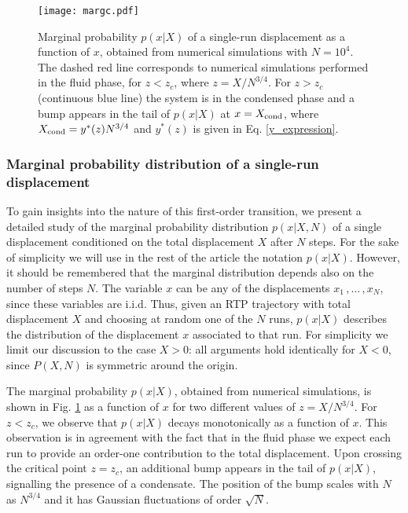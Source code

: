 \documentclass[aps,pre,twocolumn,superscriptaddress,showpacs]{revtex4-1}
\begin{document}
\begin{figure}
\texttt{[image: margc.pdf]}
\caption{Marginal probability $p(x|X)$ of a single-run displacement as a function of $x$, obtained from numerical simulations with $N=10^4$. The dashed red line corresponds to numerical simulations performed in the fluid phase, for $z<z_c$, where $z=X/N^{3/4}$. For $z>z_c$ (continuous blue line) the system is in the condensed phase and a bump appears in the tail of $p(x|X)$ at $x=X_{\rm cond}$, where $X_{\rm cond}=y^*(z)N^{3/4}$ and $y^*(z)$ is given in Eq. \eqref{y_expression}.}
\label{fig:marg}
\end{figure}


\subsubsection{Marginal probability distribution of a single-run displacement}


To gain insights into the nature of this first-order transition,
we present a detailed study of the marginal probability
distribution $p(x|X,N)$ of a single displacement conditioned on the
total displacement $X$ after $N$ steps. For the sake of simplicity we will use in the rest of the article the notation $p(x|X)$. However, it should be remembered that the marginal distribution depends also on the number of steps $N$. The variable $x$ can be any of the
displacements $x_1\,,\ldots\,,x_N$, since these variables are
i.i.d. Thus, given an RTP trajectory with total displacement $X$ and
choosing at random one of the $N$ runs, $p(x|X)$ describes the
distribution of the displacement $x$ associated to that run. For
simplicity we limit our discussion to the case $X>0$: all arguments hold identically for $X<0$, since $P(X,N)$ is symmetric around the origin.


The marginal probability $p(x|X)$, obtained from numerical simulations, is shown in Fig. \ref{fig:marg} as a function of $x$ for two different values of $z=X/N^{3/4}$. For $z<z_c$, we observe that $p(x|X)$ decays monotonically as a function of $x$. This observation is in agreement with the fact that in the fluid phase we expect each run to provide an order-one contribution to the total displacement. Upon crossing the critical point $z=z_c$, an additional bump appears in the tail of $p(x|X)$, signalling the presence of a condensate. The position of the bump scales with $N$ as $N^{3/4}$ and it has Gaussian fluctuations of order $\sqrt{N}$. 
\end{document}
